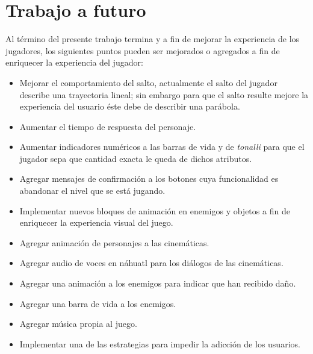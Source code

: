 \section{Trabajo a futuro}
Al término del presente trabajo termina y a fin de mejorar la experiencia de
los jugadores, los siguientes puntos pueden ser mejorados o agregados a fin de
enriquecer la experiencia del jugador:

\begin{itemize}
    \item Mejorar el comportamiento del salto, actualmente el salto del jugador describe una trayectoria lineal; sin embargo para que el salto resulte mejore la experiencia del usuario éste debe de describir una parábola.
    \item Aumentar el tiempo de respuesta del personaje.
    \item Aumentar indicadores numéricos a las barras de vida y de \textit{tonalli}
    para que el jugador sepa que cantidad exacta le queda de dichos atributos.
    \item Agregar mensajes de confirmación a los botones cuya funcionalidad es
    abandonar el nivel que se está jugando.
    \item Implementar nuevos bloques de animación en enemigos y objetos a fin de
    enriquecer la experiencia visual del juego.
    \item Agregar animación de personajes a las cinemáticas.
    \item Agregar audio de voces en náhuatl para los diálogos de las cinemáticas.
    \item Agregar una animación a los enemigos para indicar que han recibido daño.
    \item Agregar una barra de vida a los enemigos.
    \item Agregar música propia al juego.
    \item Implementar una de las estrategias para impedir la adicción de los usuarios.
\end{itemize}




